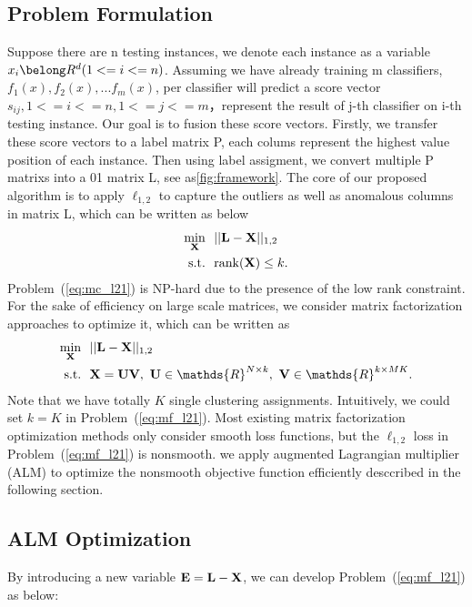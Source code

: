 \documentclass[letterpaper]{article}
\def\bE{{\bf E}}
\def\bL{{\bf L}}
\def\bU{{\bf U}}
\def\bV{{\bf V}}
\def\dsR{\mathds{R}}
\def\bX{{\bf X}}
\def\bX{{\bf X}}
\def\st{{\text{s.t.}}}
\def\rank{{\text{rank}}}
\begin{document}
\subsection{Problem Formulation}{}
Suppose there are n testing instances, we denote each instance as a variable $x_i \belong R^d (1<=i<=n)$. Assuming we have already training m classifiers, $f_1(x), f_2(x), ... f_m(x)$, per classifier will predict a score vector $s_{ij}, 1<=i<=n, 1<=j<=m$，represent the result of j-th classifier on i-th testing instance. Our goal is to fusion these score vectors. Firstly, we transfer these score vectors to a label matrix P, each colums represent the highest value position of each instance. Then using label assigment, we convert multiple P matrixs into a 01 matrix L, see as{\ref{fig:framework}}. 
The core of our proposed algorithm is to apply $\ell_{1,2}$ to capture the outliers as well as anomalous columns in matrix L, which can be written as below
\begin{align}\label{eq:l12e}
  \min_{\bX} ~&~ || \bL - \bX ||_{1,2}    \nonumber \\
  \st        ~&~ \rank(\bX) \leq k  .
\end{align}
Problem~(\ref{eq:mc_l21}) is NP-hard due to the presence of the low rank constraint.
For the sake of efficiency on large scale matrices, we consider matrix factorization approaches to optimize it, which can be written as
\begin{align}\label{eq:mf_l21}
  \min_{\bX} ~&~ || \bL - \bX ||_{1,2}    \nonumber \\
  \st        ~&~ \bX = \bU \bV,~\bU \in \dsR^{N \times k},~\bV \in \dsR^{k \times MK} .
\end{align}
\noindent
Note that we have totally $K$ single clustering assignments.
Intuitively, we could set $k = K$ in Problem~(\ref{eq:mf_l21}).
Most existing matrix factorization optimization methods only consider smooth loss functions,
but the $\ell_{1,2}$ loss in Problem~(\ref{eq:mf_l21}) is nonsmooth.
we apply augmented Lagrangian multiplier (ALM) to optimize the nonsmooth objective function efficiently desccribed in the following section.

\subsection{ALM Optimization}

By introducing a new variable $\bE = \bL - \bX$, we can develop Problem~(\ref{eq:mf_l21}) as below:
\end{document}
